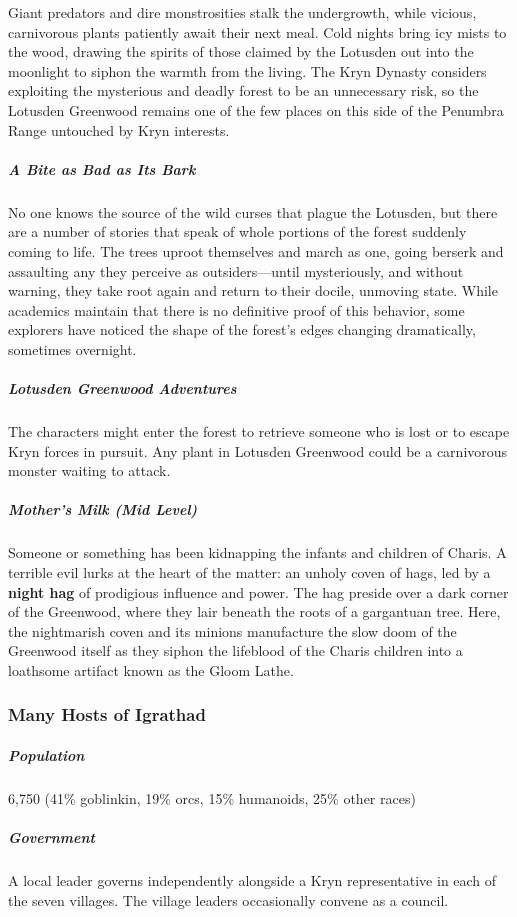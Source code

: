 \documentclass[10pt,a4paper,twoside,bg=print,twocolumn,openany,nodeprecatedcode]{dndbook}
\begin{document}
Giant predators and dire monstrosities stalk the undergrowth, while vicious, carnivorous plants patiently await their next meal. Cold nights bring icy mists to the wood, drawing the spirits of those claimed by the Lotusden out into the moonlight to siphon the warmth from the living. The Kryn Dynasty considers exploiting the mysterious and deadly forest to be an unnecessary risk, so the Lotusden Greenwood remains one of the few places on this side of the Penumbra Range untouched by Kryn interests.

\subparagraph{A Bite as Bad as Its Bark}
No one knows the source of the wild curses that plague the Lotusden, but there are a number of stories that speak of whole portions of the forest suddenly coming to life. The trees uproot themselves and march as one, going berserk and assaulting any they perceive as outsiders—until mysteriously, and without warning, they take root again and return to their docile, unmoving state. While academics maintain that there is no definitive proof of this behavior, some explorers have noticed the shape of the forest's edges changing dramatically, sometimes overnight.

\subparagraph{Lotusden Greenwood Adventures}
The characters might enter the forest to retrieve someone who is lost or to escape Kryn forces in pursuit. Any plant in Lotusden Greenwood could be a carnivorous monster waiting to attack.

\subparagraph{Mother's Milk (Mid Level)}
Someone or something has been kidnapping the infants and children of Charis. A terrible evil lurks at the heart of the matter: an unholy coven of hags, led by a \textbf{night hag} of prodigious influence and power. The hag preside over a dark corner of the Greenwood, where they lair beneath the roots of a gargantuan tree. Here, the nightmarish coven and its minions manufacture the slow doom of the Greenwood itself as they siphon the lifeblood of the Charis children into a loathsome artifact known as the Gloom Lathe.

\subsubsection{Many Hosts of Igrathad}
\subparagraph{Population}
6,750 (41\% goblinkin, 19\% orcs, 15\% humanoids, 25\% other races)

\subparagraph{Government}
A local leader governs independently alongside a Kryn representative in each of the seven villages. The village leaders occasionally convene as a council.
\end{document}
